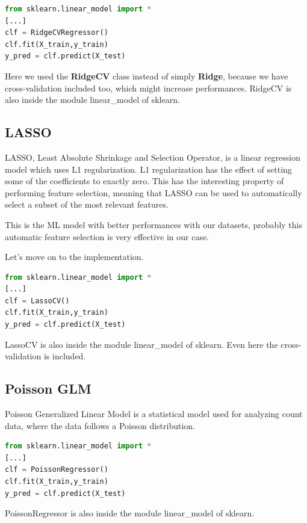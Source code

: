 \begin{lstlisting}[language=Python, caption=Ridge implementation]
from sklearn.linear_model import *
[...]
clf = RidgeCVRegressor()
clf.fit(X_train,y_train)
y_pred = clf.predict(X_test)
\end{lstlisting}

Here we used the \textbf{RidgeCV} class instead of simply \textbf{Ridge}, because we have cross-validation included too, which might increase performances. RidgeCV is also inside the module linear\_model of sklearn.

\subsection{LASSO}
LASSO, Least Absolute Shrinkage and Selection Operator, is a linear regression model which uses L1 regularization. L1 regularization has the effect of setting some of the coefficients to exactly zero. This has the interesting property of performing feature selection, meaning that LASSO can be used to automatically select a subset of the most relevant features.

This is the ML model with better performances with our datasets, probably this automatic feature selection is very effective in our case.

Let's move on to the implementation.

\begin{lstlisting}[language=Python, caption=LASSO implementation]
from sklearn.linear_model import *
[...]
clf = LassoCV()
clf.fit(X_train,y_train)
y_pred = clf.predict(X_test)
\end{lstlisting}

LassoCV is also inside the module linear\_model of sklearn. Even here the cross-validation is included.
\subsection{Poisson GLM}

Poisson Generalized Linear Model is a statistical model used for analyzing count data, where the data follows a Poisson distribution. 

\begin{lstlisting}[language=Python, caption=Poisson-GLM implementation]
from sklearn.linear_model import *
[...]
clf = PoissonRegressor()
clf.fit(X_train,y_train)
y_pred = clf.predict(X_test)
\end{lstlisting}

PoissonRegressor is also inside the module linear\_model of sklearn.
